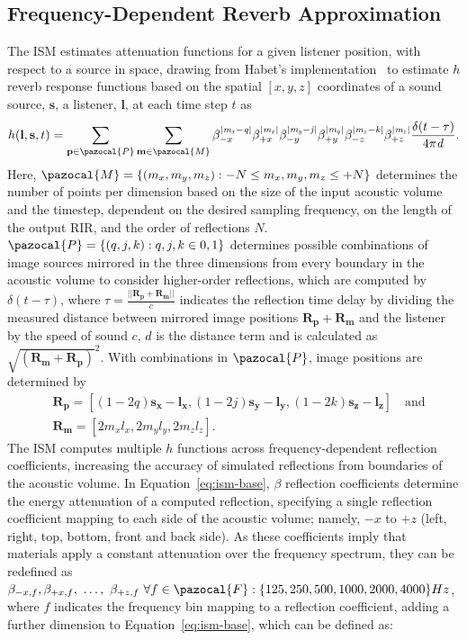 \subsection{Frequency-Dependent Reverb Approximation}
The ISM estimates attenuation functions for a given listener position, with respect to a source in space, drawing from Habet's implementation~\citep{habets2006room} to estimate $h$ reverb response functions based on the spatial $[x, y, z]$ coordinates of a sound source, $\mathbf{s}$, a listener, $\mathbf{l}$, at each time step $t$ as 
\begin{equation}
\label{eq:ism-base}
h(\mathbf{l}, \mathbf{s}, t) = \sum_{\mathbf{p} \in \pazocal{P}} \sum_{\mathbf{m} \in \pazocal{M}} \beta_{-x}^{|\mathit{m_x - q}|} \beta_{+x}^{|\mathit{m_x}|} \beta_{-y}^{|\mathit{m_y - j}|} \beta_{+y}^{|\mathit{m_y}|} \beta_{-z}^{|\mathit{m_z - k}|}  \beta_{+z}^{|\mathit{m_z}|} \frac{\delta(t - \tau)}{4\pi \mathit{d}}\textrm{.}
\end{equation}
Here, $\pazocal{M} = \{(m_x, m_y, m_z): -N \leq m_x, m_y, m_z \leq +N\}$ determines the number of points per dimension based on the size of the input acoustic volume and the timestep, dependent on the desired sampling frequency, on the length of the output RIR, and the order of reflections $N$. $\pazocal{P} = \{ (q, j, k): q, j, k \in {0, 1} \}$ determines possible combinations of image sources mirrored in the three dimensions from every boundary in the acoustic volume to consider higher-order reflections, which are computed by $\delta (t - \tau)$, where $\tau = \frac{||\mathbf{R_p} + \mathbf{R_m}||}{c}$ indicates the reflection time delay by dividing the measured distance between mirrored image positions $\mathbf{R_p} + \mathbf{R_m}$ and the listener by the speed of sound $c$, $d$ is the distance term and is calculated as $\sqrt{(\mathbf{R_m}+\mathbf{R_p})}^2$. With combinations in $\pazocal{P}$, image positions are determined by
\begin{align*}
&\mathbf{R_p} = [ (1 - 2q)\mathbf{s_x} - \mathbf{l_x}, (1 - 2j)\mathbf{s_y} - \mathbf{l_y}, (1 - 2k)\mathbf{s_z} - \mathbf{l_z} ] 
\quad \textrm{and} \\
&\mathbf{R_m} = [2 m_x l_x, 2 m_y l_y, 2 m_z l_z]\textrm{.}
\end{align*}
The ISM computes multiple $h$ functions across frequency-dependent reflection coefficients, increasing the accuracy of simulated reflections from boundaries of the acoustic volume. In Equation~\ref{eq:ism-base}, $\beta$ reflection coefficients determine the energy attenuation of a computed reflection, specifying a single reflection coefficient mapping to each side of the acoustic volume; namely, $-x$ to $+z$  (left, right, top, bottom, front and back side). As these coefficients imply that materials apply a constant attenuation over the frequency spectrum, they can be redefined as $\beta_{-x,f}, \beta_{+x,f},~\dots, ~\beta_{+z,f}~\forall f \in \pazocal{F}: \{125, 250, 500, 1000, 2000, 4000\} Hz$, where $f$ indicates the frequency bin mapping to a reflection coefficient, adding a further dimension to Equation~\ref{eq:ism-base}, which can be defined as:
